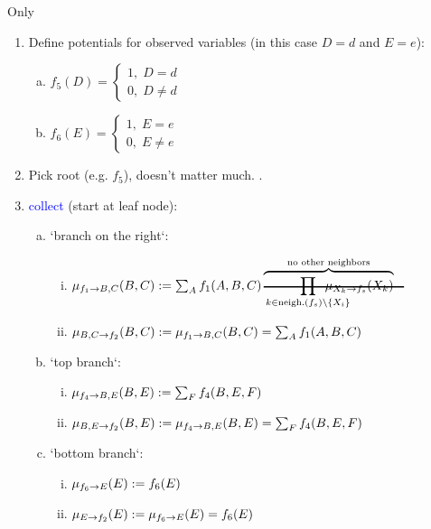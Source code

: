 \begin{frame}{Only}
\begingroup
\footnotesize
\begin{enumerate}
 \item<only@1> Define potentials for observed variables (in this case $D=d$ and $E=e$):
 \begin{enumerate}[(a)]
 \item $f_5(D) = 
						\left\{\begin{array}{c} 
							1, \; D=d \\[-1mm]
							0, \; D \neq d 
						\end{array}\right.$
 \item $f_6(E) = 
						\left\{\begin{array}{c} 
							1, \; E=e \\[-1mm]
							0, \; E \neq e 
						\end{array}\right.$
 \end{enumerate}
 \item<only@1> Pick root (e.g. $f_{5}$), doesn't matter much. .
 \item<only@1-5> \textcolor{blue}{collect} (start at leaf node): 
 \begin{enumerate}[(a)]
  \item<only@2> `branch on the right`:
  \begin{enumerate}[(i)]
  \item $\msg{f_{1}}{B,C}(B,C) := \sum_{A} f_{1}(A,B,C) \overbrace{\hcancel{\prod_{k \in \text{neigh.}(f_s)\setminus\{X_i\}}\kern-5ex 
			\mu_{X_k \to f_s}(X_k)}}^{\text{no other neighbors}}$
  \item $\mu_{B,C\rightarrow f_{2}}(B,C) := \mu_{f_{1}\rightarrow B,C}(B,C) = \sum_{A} f_{1}(A,B,C)$
  \end{enumerate}
  \item<only@3> `top branch`:
  \begin{enumerate}[(i)]
  \item $\mu_{f_{4}\rightarrow B,E}(B,E) := \sum_{F} f_{4}(B,E,F)$
  \item $\mu_{B,E\rightarrow f_{2}}(B,E) := \mu_{f_{4}\rightarrow B,E}(B,E) = \sum_{F} f_{4}(B,E,F)$
  \end{enumerate}
  \item<only@4> `bottom branch`:
  \begin{enumerate}[(i)]
  \item $\mu_{f_{6}\rightarrow E}(E) := f_{6}(E)$
  \item $\mu_{E\rightarrow f_{2}}(E) := \mu_{f_{6}\rightarrow E}(E) = f_{6}(E)$

\end{enumerate}
\end{enumerate}
\end{enumerate}
\end{frame}
